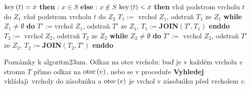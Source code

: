 \phantom{---}{\bf endif\newline 
enddo\newline 
if} $\operatorname{key}\left(t\right)=x$ {\bf then}\newline 
\phantom{---}{\bf V\'ystup}: $x\in S$\newline 
{\bf else}\newline 
\phantom{---}{\bf V\'ystup}: $x\notin S$\newline 
\phantom{---}{\bf if} $\operatorname{key}\left(t\right)<x$ {\bf then}\newline 
\phantom{------}vlo\v z podstrom vrcholu $t$ do $Z_1$\newline 
\phantom{---}{\bf else}\newline 
\phantom{------}vlo\v z podstrom vrcholu $t$ do $Z_2$\newline 
\phantom{---}{\bf endif\newline 
endif}\newline 
$T_1:=\text{ vrchol }Z_1$, odstra\v n $T_1$ ze $Z_1$\newline 
{\bf while} $Z_1\ne\emptyset$ {\bf do}\newline 
\phantom{---}$T':=$vrchol $Z_1$, odstra\v n $T'$ ze $Z_1$, $T_1:=${\bf JOIN}$\left(T',T_1\right)$\newline 
{\bf enddo}\newline 
$T_2:=\text{ vrchol }Z_2$, odstra\v n $T_2$ ze $Z_2$\newline 
{\bf while} $Z_2\ne\emptyset$ {\bf do}\newline 
\phantom{---}$T':=\text{ vrchol }Z_2$, odstra\v n $T'$ ze $Z_2$, $T_2:=${\bf JOIN$\left(T_2,T'\right)$\newline 
enddo}
\medskip

\flushpar Pozn\'amky k algoritm\accent23um. \newline 
Odkaz na otce vrcholu: bu\v d je v ka\v zd\'em vrcholu $v$ 
stromu $T$ p\v r\'\i mo odkaz na $\operatorname{otec}\left(v\right)$, nebo se v procedu\v re 
{\bf Vyhledej} vkl\'ada\-j\'\i\ vrcholy do z\'asobn\'\i ku a $\operatorname{otec}
\left(v\right)$ 
je vrchol v z\'asobn\'\i ku p\v red vrcholem $v$.
\smallskip

